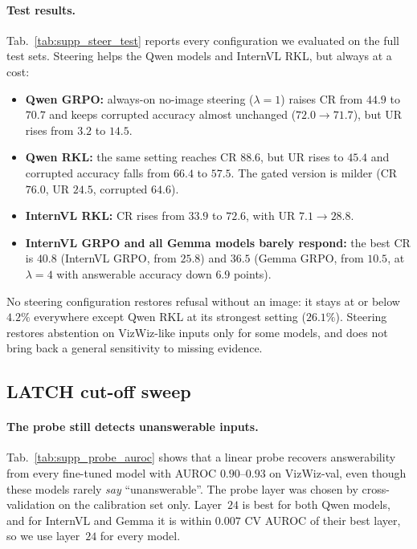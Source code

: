 \paragraph{Test results.}
Tab.~\ref{tab:supp_steer_test} reports every configuration we evaluated on the full test
sets. Steering helps the Qwen models and InternVL RKL, but always at a cost:
\begin{itemize}\itemsep0pt
  \item \textbf{Qwen GRPO:} always-on no-image steering ($\lambda{=}1$) raises CR from $44.9$
        to $70.7$ and keeps corrupted accuracy almost unchanged ($72.0\rightarrow71.7$), but
        UR rises from $3.2$ to $14.5$.
  \item \textbf{Qwen RKL:} the same setting reaches CR $88.6$, but UR rises to $45.4$ and
        corrupted accuracy falls from $66.4$ to $57.5$. The gated version is milder (CR
        $76.0$, UR $24.5$, corrupted $64.6$).
  \item \textbf{InternVL RKL:} CR rises from $33.9$ to $72.6$, with UR $7.1\rightarrow28.8$.
  \item \textbf{InternVL GRPO and all Gemma models barely respond:} the best CR is $40.8$
        (InternVL GRPO, from $25.8$) and $36.5$ (Gemma GRPO, from $10.5$, at $\lambda{=}4$
        with answerable accuracy down $6.9$ points).
\end{itemize}
No steering configuration restores refusal without an image: it stays at or below $4.2\%$
everywhere except Qwen RKL at its strongest setting ($26.1\%$). Steering restores abstention
on VizWiz-like inputs only for some models, and does not bring back a general sensitivity to
missing evidence.

\subsection{LATCH cut-off sweep}
\label{sec:supp_probe_tau}

\paragraph{The probe still detects unanswerable inputs.}
Tab.~\ref{tab:supp_probe_auroc} shows that a linear probe recovers answerability from every
fine-tuned model with AUROC $0.90$--$0.93$ on VizWiz-val, even though these models rarely
\emph{say} ``unanswerable''. The probe layer was chosen by cross-validation on the
calibration set only. Layer~$24$ is best for both Qwen models, and for InternVL and Gemma it
is within $0.007$ CV AUROC of their best layer, so we use layer~$24$ for every model.

